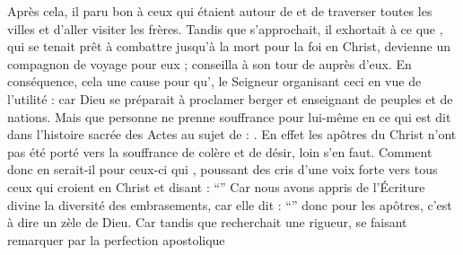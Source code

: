 Après cela, il paru bon à ceux qui étaient autour de  et  
de traverser toutes les villes et d'aller visiter les frères.
Tandis que  s'approchait, il exhortait 
à ce que , 
qui se tenait prêt à combattre jusqu'à la mort pour la foi en Christ, 
devienne un compagnon de voyage pour eux ; %
 conseilla à son tour de  auprès d'eux.
En conséquence, cela  une cause pour qu', le Seigneur organisant ceci en vue de l'utilité : %
car Dieu se préparait à proclamer   berger et enseignant de peuples et de nations. %
Mais que personne ne prenne souffrance  pour lui-même en  ce qui est dit dans l'histoire sacrée des Actes au sujet de  : .
En effet les apôtres du Christ n'ont pas été porté vers la souffrance de colère et de désir,  loin s'en faut.
Comment donc en serait-il pour ceux-ci qui , poussant des cris d'une voix forte vers tous ceux qui croient en Christ et disant :
\enquote{} %
Car nous avons appris de l'Écriture divine la diversité des embrasements, car elle dit :
\enquote{}
 donc  %
pour les apôtres, c'est à dire un zèle de Dieu.
Car tandis que  recherchait une rigueur,
se faisant remarquer par la perfection apostolique
